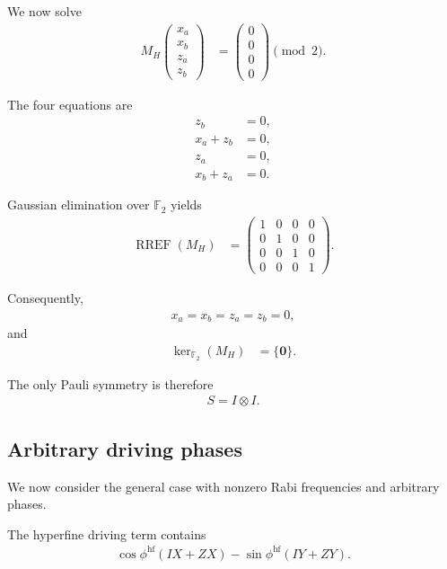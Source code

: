\documentclass[amssymb,twocolumn,aps]{revtex4-2}
\begin{document}
We now solve
\begin{align*}
    M_H
    \begin{pmatrix}
        x_a\\x_b\\z_a\\z_b
    \end{pmatrix}
    &=
    \begin{pmatrix}
        0\\0\\0\\0
    \end{pmatrix}
    \pmod 2.
\end{align*}

The four equations are
\begin{align*}
    z_b &= 0,\\
    x_a+z_b &= 0,\\
    z_a &= 0,\\
    x_b+z_a &= 0.
\end{align*}

Gaussian elimination over $\mathbb{F}_2$ yields
\begin{align*}
    \operatorname{RREF}(M_H)
    &=
    \begin{pmatrix}
        1&0&0&0\\
        0&1&0&0\\
        0&0&1&0\\
        0&0&0&1
    \end{pmatrix}.
\end{align*}

Consequently,
\begin{align*}
    x_a=x_b=z_a=z_b=0,
\end{align*}
and
\begin{align*}
    \ker_{\mathbb{F}_2}(M_H)&=\{\mathbf{0}\}.
\end{align*}

The only Pauli symmetry is therefore
\begin{align*}
    S=I\otimes I.
\end{align*}

\subsection*{Arbitrary driving phases}

We now consider the general case with nonzero
Rabi frequencies and arbitrary phases.

The hyperfine driving term contains
\begin{align*}
    \cos\phi^{\mathrm{hf}}(IX+ZX)
    -\sin\phi^{\mathrm{hf}}(IY+ZY).
\end{align*}
\end{document}
